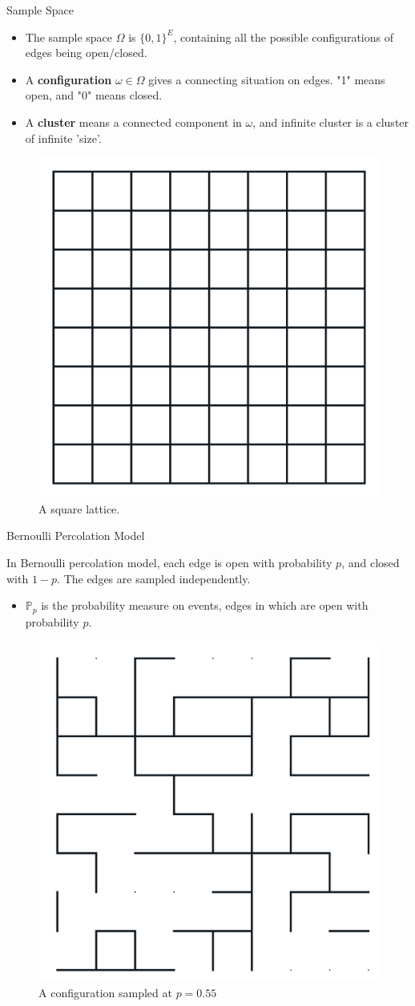 \documentclass{beamer}
\begin{document}
\begin{frame}{Sample Space}
    \begin{exampleblock}{} %
        \begin{itemize}
            \item The sample space $\Omega$ is $\{0,1\}^E$, containing all the possible configurations of edges being open/closed.\\
            \item A \textbf{configuration} $\omega \in \Omega$ gives a connecting situation on edges. "1" means open, and "0" means closed. \\
            \item A \textbf{cluster} means a connected component in $\omega$, and infinite cluster is a cluster of infinite 'size'. 
    \end{itemize}
    \end{exampleblock}
    \begin{figure}[htpb]
        \centering
        \includegraphics[width=0.23\linewidth]{p1.png}
        \captionsetup{labelformat=empty}
        \caption{A square lattice.}
    \end{figure}
\end{frame}

\begin{frame}{Bernoulli Percolation Model}
    \begin{exampleblock}{} %
        In Bernoulli percolation model, each edge is open with probability $p$, and closed with $1-p$. The edges are sampled independently.
        \begin{itemize}
            \item $\mathbb{P}_p$ is the probability measure on events, edges in which are open with probability $p$. 
    \end{itemize}
    \end{exampleblock}
    \begin{figure}[htpb]
        \centering
        \includegraphics[width=0.2\linewidth]{p0.55.png}
        \captionsetup{labelformat=empty}
        \caption{A configuration sampled at $p = 0.55$}
    \end{figure}
\end{frame}
\end{document}
